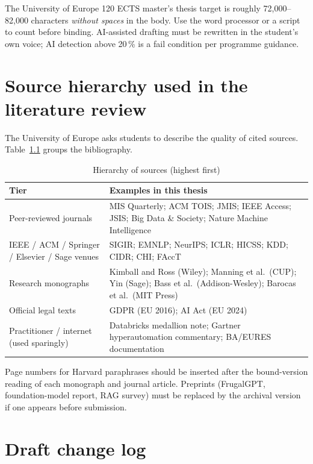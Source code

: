The University of Europe 120 ECTS master's thesis target is roughly 72{,}000--82{,}000 characters \emph{without spaces} in the body. Use the word processor or a script to count before binding. AI-assisted drafting must be rewritten in the student's own voice; AI detection above 20\,\% is a fail condition per programme guidance.

\chapter{Source hierarchy used in the literature review}
\label{app:sources}

The University of Europe asks students to describe the quality of cited sources. Table~\ref{tab:hierarchy} groups the bibliography.

\begin{table}[ht]
\centering
\caption{Hierarchy of sources (highest first)}
\label{tab:hierarchy}
\begin{tabularx}{\textwidth}{@{}lX@{}}
\toprule
\textbf{Tier} & \textbf{Examples in this thesis} \\
\midrule
Peer-reviewed journals & MIS Quarterly; ACM TOIS; JMIS; IEEE Access; JSIS; Big Data \& Society; Nature Machine Intelligence \\
IEEE / ACM / Springer / Elsevier / Sage venues & SIGIR; EMNLP; NeurIPS; ICLR; HICSS; KDD; CIDR; CHI; FAccT \\
Research monographs & Kimball and Ross (Wiley); Manning et al.\ (CUP); Yin (Sage); Bass et al.\ (Addison-Wesley); Barocas et al.\ (MIT Press) \\
Official legal texts & GDPR (EU 2016); AI Act (EU 2024) \\
Practitioner / internet (used sparingly) & Databricks medallion note; Gartner hyperautomation commentary; BA/EURES documentation \\
\bottomrule
\end{tabularx}
\end{table}

Page numbers for Harvard paraphrases should be inserted after the bound-version reading of each monograph and journal article. Preprints (FrugalGPT, foundation-model report, RAG survey) must be replaced by the archival version if one appears before submission.

\chapter{Draft change log}
\label{app:changelog}

